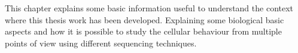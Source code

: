 This chapter explains some basic information useful to understand the context where this thesis work has been developed.
Explaining some biological basic aspects and how it is possible to study the cellular behaviour from multiple points of view using different sequencing techniques.